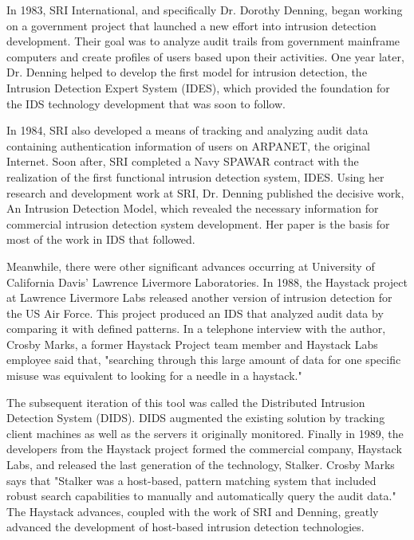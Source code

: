\documentclass[thesis=M,english]{FITthesis}[2011/07/15]
\begin{document}
In 1983, SRI International, and specifically Dr. Dorothy Denning, began working on a government project that launched a new effort into intrusion detection development. Their goal was to analyze audit trails from government mainframe computers and create profiles of users based upon their activities. One year later, Dr. Denning helped to develop the first model for intrusion detection, the Intrusion Detection Expert System (IDES), which provided the foundation for the IDS technology development that was soon to follow.

In 1984, SRI also developed a means of tracking and analyzing audit data containing authentication information of users on ARPANET, the original Internet. Soon after, SRI completed a Navy SPAWAR contract with the realization of the first functional intrusion detection system, IDES. Using her research and development work at SRI, Dr. Denning published the decisive work, An Intrusion Detection Model, which revealed the necessary information for commercial intrusion detection system development. Her paper is the basis for most of the work in IDS that followed.

Meanwhile, there were other significant advances occurring at University of California Davis' Lawrence Livermore Laboratories. In 1988, the Haystack project at Lawrence Livermore Labs released another version of intrusion detection for the US Air Force. This project produced an IDS that analyzed audit data by comparing it with defined patterns. In a telephone interview with the author, Crosby Marks, a former Haystack Project team member and Haystack Labs employee said that, "searching through this large amount of data for one specific misuse was equivalent to looking for a needle in a haystack."

The subsequent iteration of this tool was called the Distributed Intrusion Detection System (DIDS). DIDS augmented the existing solution by tracking client machines as well as the servers it originally monitored. Finally in 1989, the developers from the Haystack project formed the commercial company, Haystack Labs, and released the last generation of the technology, Stalker. Crosby Marks says that "Stalker was a host-based, pattern matching system that included robust search capabilities to manually and automatically query the audit data." The Haystack advances, coupled with the work of SRI and Denning, greatly advanced the development of host-based intrusion detection technologies.
\end{document}
